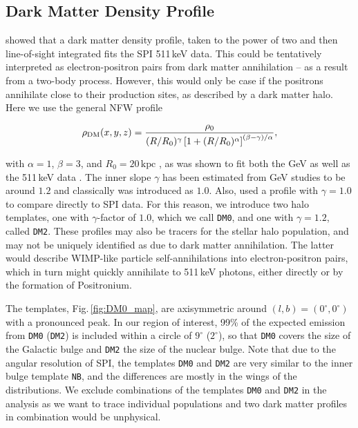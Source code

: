 \documentclass[doublespace,nopageskip]{VTthesis} %
\newcommand{\mrm}[1]{\mathrm{#1}}
\begin{document}
\begin{appendices}
	
	\subsection{Dark Matter Density Profile}
	
	\citet{Skinner2014_511} showed that a dark matter density profile, taken to the power of two and then line-of-sight integrated fits the SPI 511\,keV data.
	This could be tentatively interpreted as electron-positron pairs from dark matter annihilation -- as a result from a two-body process.
	However, this would only be case if the positrons annihilate close to their production sites, as described by a dark matter halo.
	Here we use the general NFW profile \citep{Navarro1997_NFW}
	
	\begin{equation}
		\rho_{\rm DM}(x,y,z) = \frac{\rho_0}{(R/R_0)^{\gamma}\left[1+(R/R_0)^{\alpha}\right]^{(\beta-\gamma)/\alpha}}\mrm{,}
		\label{eq:NFW_profile}
	\end{equation}
	
	\noindent with $\alpha=1$, $\beta=3$, and $R_0=20\,\mrm{kpc}$ \citep{Abazajian2014_DMGeV}, as was shown to fit both the GeV \citep{Hooper2011_DMGeV,Abazajian2014_DMGeV,Daylan2016_GeVDM} as well as the 511\,keV data \citep{Vincent2012_dm511,Skinner2014_511}.
	The inner slope $\gamma$ has been estimated from GeV studies to be around $1.2$ and classically was introduced as $1.0$.
	Also, \citet{Skinner2014_511} used a profile with $\gamma=1.0$ to compare directly to SPI data.
	For this reason, we introduce two halo templates, one with $\gamma$-factor of $1.0$, which we call \texttt{DM0}, and one with $\gamma=1.2$, called \texttt{DM2}.
	These profiles may also be tracers for the stellar halo population, and may not be uniquely identified as due to dark matter annihilation.
	The latter would describe WIMP-like particle self-annihilations into electron-positron pairs, which in turn might quickly annihilate to 511\,keV photons, either directly or by the formation of Positronium.
	
	The templates, Fig.\,\ref{fig:DM0_map}, are axisymmetric around $(l,b)=(0^{\circ},0^{\circ})$ with a pronounced peak.
	In our region of interest, 99\% of the expected emission from \texttt{DM0} (\texttt{DM2}) is included within a circle of $9^{\circ}$ ($2^{\circ}$), so that \texttt{DM0} covers the size of the Galactic bulge and \texttt{DM2} the size of the nuclear bulge.
	Note that due to the angular resolution of SPI, the templates \texttt{DM0} and \texttt{DM2} are very similar to the inner bulge template \texttt{NB}, and the differences are mostly in the wings of the distributions.
	We exclude combinations of the templates \texttt{DM0} and \texttt{DM2} in the analysis as we want to trace individual populations and two dark matter profiles in combination would be unphysical.
	

\end{appendices}
\end{document}
